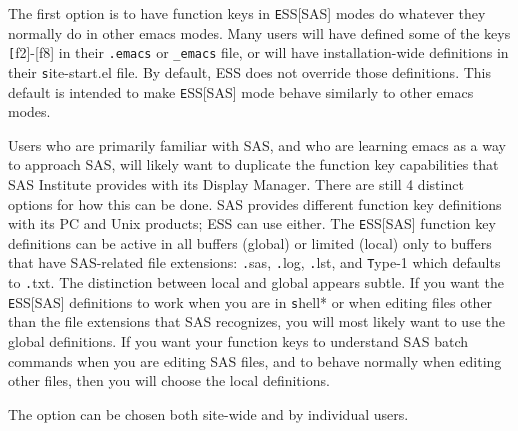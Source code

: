 \documentclass{article}
\begin{document}
The first option is to have function keys in {\texttt ESS[SAS]} modes do
whatever they normally do in other emacs modes.  Many users will have
defined some of the keys {\texttt[f2]-[f8]} in their \verb+.emacs+ or
\verb|_emacs| file, or will have installation-wide definitions in
their {\texttt site-start.el} file.  By default, ESS does not override those
definitions.  This default is intended to make {\texttt ESS[SAS]} mode behave
similarly to other emacs modes.

Users who are primarily familiar with SAS, and who are learning emacs
as a way to approach SAS, will likely want to duplicate the function
key capabilities that SAS Institute provides with its Display Manager.
There are still 4 distinct options for how this can be done.  SAS
provides different function key definitions with its PC and Unix
products; ESS can use either.  The {\texttt ESS[SAS]} function key definitions
can be active in all buffers (global) or limited (local) only to
buffers that have SAS-related file extensions: {\texttt .sas}, {\texttt .log}, {\texttt .lst}, and
{\texttt Type-1} which defaults to {\texttt .txt}.  The distinction between local and
global appears subtle.  If you want the {\texttt ESS[SAS]} definitions to work
when you are in {\texttt *shell*} or when editing files other than the file
extensions that SAS recognizes, you will most likely want to use the
global definitions.  If you want your function keys to understand SAS
batch commands when you are editing SAS files, and to behave normally
when editing other files, then you will choose the local definitions.

The option can be chosen both site-wide and by individual users.

\end{document}
